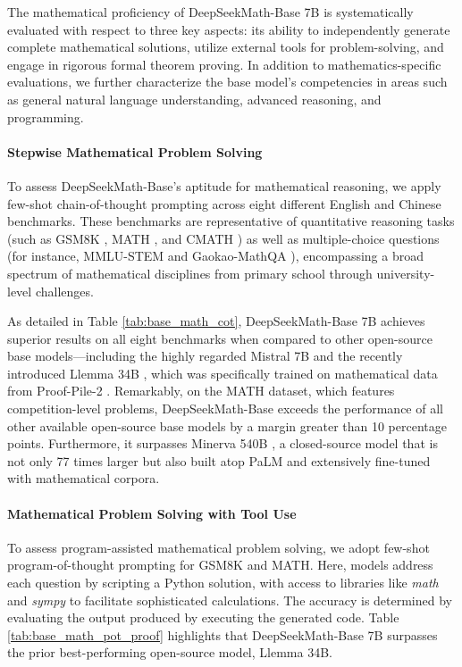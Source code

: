 The mathematical proficiency of DeepSeekMath-Base 7B is systematically evaluated with respect to three key aspects: its ability to independently generate complete mathematical solutions, utilize external tools for problem-solving, and engage in rigorous formal theorem proving. In addition to mathematics-specific evaluations, we further characterize the base model’s competencies in areas such as general natural language understanding, advanced reasoning, and programming.

\paragraph{Stepwise Mathematical Problem Solving}

To assess DeepSeekMath-Base's aptitude for mathematical reasoning, we apply few-shot chain-of-thought prompting \citep{cot} across eight different English and Chinese benchmarks. These benchmarks are representative of quantitative reasoning tasks (such as GSM8K \citep{gsm8k}, MATH \citep{MATH}, and CMATH \citep{wei2023cmath}) as well as multiple-choice questions (for instance, MMLU-STEM \citep{mmlu} and Gaokao-MathQA \citep{agieval}), encompassing a broad spectrum of mathematical disciplines from primary school through university-level challenges.

As detailed in Table \ref{tab:base_math_cot}, DeepSeekMath-Base 7B achieves superior results on all eight benchmarks when compared to other open-source base models—including the highly regarded Mistral 7B \citep{mistral} and the recently introduced Llemma 34B \citep{llemma}, which was specifically trained on mathematical data from Proof-Pile-2 \citep{llemma}. Remarkably, on the MATH dataset, which features competition-level problems, DeepSeekMath-Base exceeds the performance of all other available open-source base models by a margin greater than 10 percentage points. Furthermore, it surpasses Minerva 540B \citep{minerva}, a closed-source model that is not only 77 times larger but also built atop PaLM \citep{palm} and extensively fine-tuned with mathematical corpora.

\paragraph{Mathematical Problem Solving with Tool Use} To assess program-assisted mathematical problem solving, we adopt few-shot program-of-thought prompting \citep{pot,pal} for GSM8K and MATH. Here, models address each question by scripting a Python solution, with access to libraries like \textit{math} and \textit{sympy} to facilitate sophisticated calculations. The accuracy is determined by evaluating the output produced by executing the generated code. Table \ref{tab:base_math_pot_proof} highlights that DeepSeekMath-Base 7B surpasses the prior best-performing open-source model, Llemma 34B.

